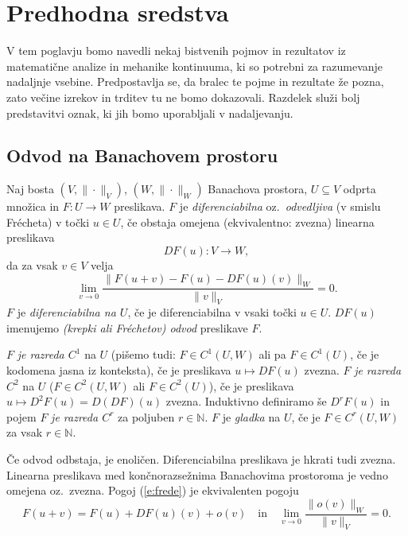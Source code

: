 \chapter{Predhodna sredstva}


V tem poglavju bomo navedli nekaj bistvenih pojmov in rezultatov iz matematične analize
in mehanike kontinuuma, ki so potrebni za razumevanje nadaljnje vsebine. Predpostavlja
se, da bralec te pojme in rezultate že pozna, zato večine izrekov in trditev
tu ne bomo dokazovali. Razdelek služi bolj predstavitvi oznak, ki jih
bomo uporabljali v nadaljevanju.


\section{Odvod na Banachovem prostoru}


\begin{definicija} \label{def:odvod}
	Naj bosta $(V,\|\cdot\|_V)$, $(W,\|\cdot\|_W)$ Banachova prostora, $U\subseteq V$ odprta
	množica in $F\colon U\to W$ preslikava. $F$ je \emph{diferenciabilna} oz.~\emph{odvedljiva}
	(v smislu Frécheta) v točki $u\in U$, če obstaja omejena (ekvivalentno: zvezna) linearna preslikava
	\[ DF(u)\colon V\to W, \]
	da za vsak $v\in V$ velja
	\begin{equation} \label{e:frede}
		\lim_{v\to 0}\frac{\|F(u+v)-F(u)-DF(u)(v)\|_W}{\|v\|_V}=0.
	\end{equation}
	$F$ je \emph{diferenciabilna na $U$}, če je diferenciabilna v vsaki točki $u\in U$.
	$DF(u)$ imenujemo \emph{(krepki ali Fréchetov) odvod} preslikave $F$.
	
	$F$ \emph{je razreda $C^1$} na $U$ (pišemo tudi: $F\in C^1(U,W)$ ali pa $F\in C^1(U)$,
	če je kodomena jasna iz konteksta), če je preslikava $u\mapsto DF(u)$ zvezna.
	$F$ \emph{je razreda $C^2$} na $U$ ($F\in C^2(U,W)$ ali $F\in C^2(U)$),
	če je preslikava $u\mapsto D^2F(u)=D(DF)(u)$ zvezna. Induktivno definiramo še $D^rF(u)$ in pojem
	$F$ \emph{je razreda $C^r$} za poljuben $r\in\mathbb{N}$. $F$ je \emph{gladka} na $U$,
	če je $F\in C^r(U,W)$ za vsak $r\in\mathbb{N}$.
\end{definicija}

Če odvod odbstaja, je enoličen. Diferenciabilna preslikava je hkrati tudi zvezna.
Linearna preslikava med končnorazsežnima Banachovima prostoroma je vedno omejena
oz.~zvezna. Pogoj (\ref{e:frede}) je ekvivalenten pogoju
\begin{equation*} \label{e:odekvi}
	F(u+v)=F(u)+DF(u)(v)+o(v)\quad\textrm{in}\quad
	\lim_{v\to 0}\frac{\|o(v)\|_W}{\|v\|_V}=0.
\end{equation*}

